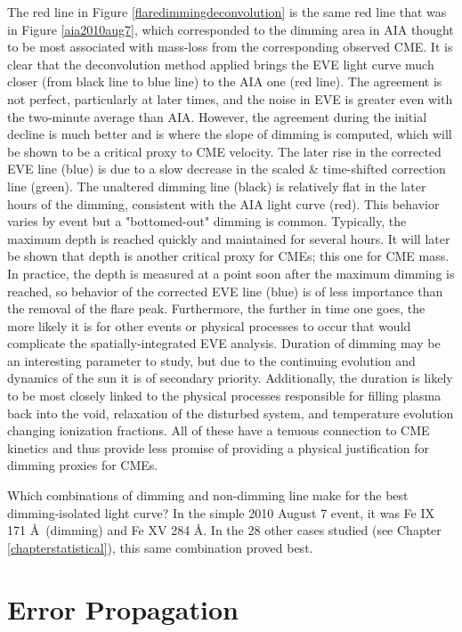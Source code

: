 The red line in Figure \ref{flaredimmingdeconvolution} is the same red line that was in Figure \ref{aia2010aug7}, which corresponded to the dimming area in AIA thought to be most associated with mass-loss from the corresponding observed CME. It is clear that the deconvolution method applied brings the EVE light curve much closer (from black line to blue line) to the AIA one (red line). The agreement is not perfect, particularly at later times, and the noise in EVE is greater even with the two-minute average than AIA. However, the agreement during the initial decline is much better and is where the slope of dimming is computed, which will be shown to be a critical proxy to CME velocity. The later rise in the corrected EVE line (blue) is due to a slow decrease in the scaled \& time-shifted correction line (green). The unaltered dimming line (black) is relatively flat in the later hours of the dimming, consistent with the AIA light curve (red). This behavior varies by event but a "bottomed-out" dimming is common. Typically, the maximum depth is reached quickly and maintained for several hours. It will later be shown that depth is another critical proxy for CMEs; this one for CME mass. In practice, the depth is measured at a point soon after the maximum dimming is reached, so behavior of the corrected EVE line (blue) is of less importance than the removal of the flare peak. Furthermore, the further in time one goes, the more likely it is for other events or physical processes to occur that would complicate the spatially-integrated EVE analysis. Duration of dimming may be an interesting parameter to study, but due to the continuing evolution and dynamics of the sun it is of secondary priority. Additionally, the duration is likely to be most closely linked to the physical processes responsible for filling plasma back into the void, relaxation of the disturbed system, and temperature evolution changing ionization fractions. All of these have a tenuous connection to CME kinetics and thus provide less promise of providing a physical justification for dimming proxies for CMEs. 

Which combinations of dimming and non-dimming line make for the best dimming-isolated light curve? In the simple 2010 August 7 event, it was Fe IX 171 \AA\ (dimming) and Fe XV 284 \AA. In the 28 other cases studied (see Chapter \ref{chapterstatistical}), this same combination proved best. 

\section{Error Propagation}
\label{sec:deconvolveerrors}

